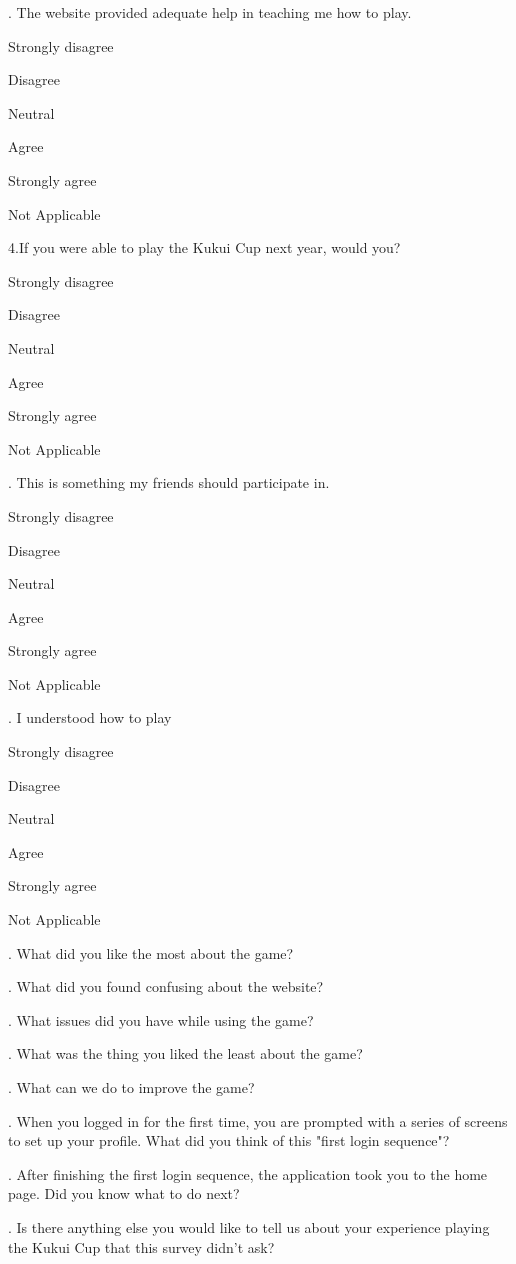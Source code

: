 . The website provided adequate help in teaching me how to play.
\begin{radiobutton}
	\item Strongly disagree
	\item Disagree
	\item Neutral
	\item Agree
	\item Strongly agree
	\item Not Applicable
\end{radiobutton}

\noindent
4.If you were able to play the Kukui Cup next year, would you?
\begin{radiobutton}
	\item Strongly disagree
	\item Disagree
	\item Neutral
	\item Agree
	\item Strongly agree
	\item Not Applicable
\end{radiobutton}

. This is something my friends should participate in.
\begin{radiobutton}
	\item Strongly disagree
	\item Disagree
	\item Neutral
	\item Agree
	\item Strongly agree
	\item Not Applicable
\end{radiobutton}

. I understood how to play
\begin{radiobutton}
	\item Strongly disagree
	\item Disagree
	\item Neutral
	\item Agree
	\item Strongly agree
	\item Not Applicable
\end{radiobutton}

. What did you like the most about the game?

. What did you found confusing about the website?

. What issues did you have while using the game?

. What was the thing you liked the least about the game?

. What can we do to improve the game?

. When you logged in for the first time, you are prompted with a series of screens to set up your profile.
What did you think of this "first login sequence"?

. After finishing the first login sequence, the application took you to the home page. Did you know what to do next?

. Is there anything else you would like to tell us about your experience playing the Kukui Cup that this
survey didn't ask?
